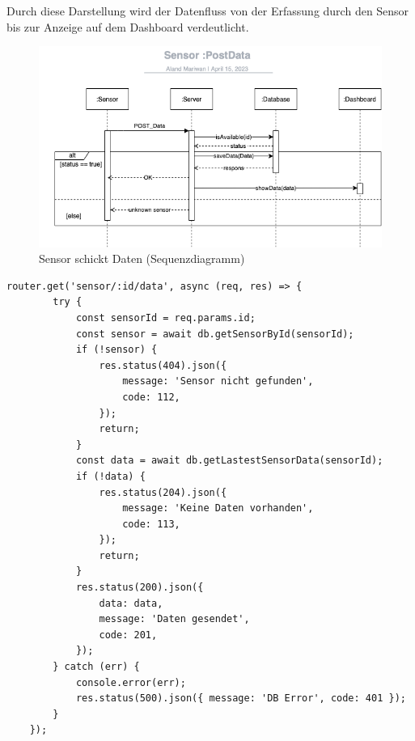 Durch diese Darstellung wird der Datenfluss von der Erfassung durch den Sensor bis zur Anzeige auf dem Dashboard verdeutlicht.

\begin{figure}[h]
	\centering
	\includegraphics[width=1\textwidth]{img/postData_sequence_Diagramm.png}
	\caption{Sensor schickt Daten (Sequenzdiagramm)}
\end{figure}
\clearpage




\begin{lstlisting}[caption={Sensor schickt Daten (Backend)}, style=js]
	router.get('sensor/:id/data', async (req, res) => {
		try {
			const sensorId = req.params.id;
			const sensor = await db.getSensorById(sensorId);
			if (!sensor) {
				res.status(404).json({
					message: 'Sensor nicht gefunden',
					code: 112,
				});
				return;
			}
			const data = await db.getLastestSensorData(sensorId);
			if (!data) {
				res.status(204).json({
					message: 'Keine Daten vorhanden',
					code: 113,
				});
				return;
			}
			res.status(200).json({
				data: data,
				message: 'Daten gesendet',
				code: 201,
			});
		} catch (err) {
			console.error(err);
			res.status(500).json({ message: 'DB Error', code: 401 });
		}
	});
\end{lstlisting}

